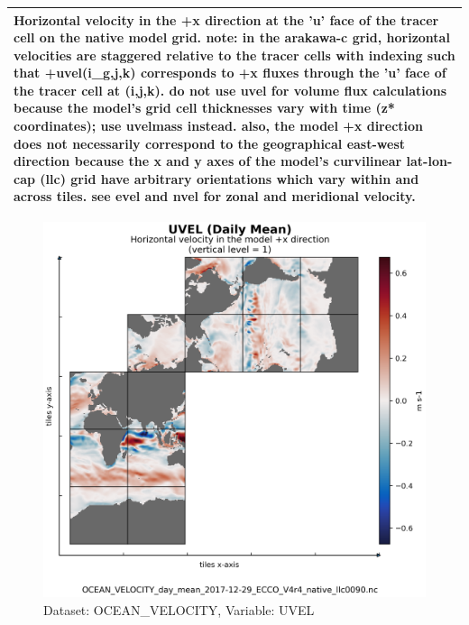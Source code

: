 \begin{longtable}{|m{}|m{}|m{}|m{}|}
\multicolumn{4}{|p{1\textwidth}|}{\footnotesize{{Horizontal velocity in the +x direction at the 'u' face of the tracer cell on the native model grid. note: in the arakawa-c grid, horizontal velocities are staggered relative to the tracer cells with indexing such that +uvel(i\_g,j,k) corresponds to +x fluxes through the 'u' face of the tracer cell at (i,j,k). do not use uvel for volume flux calculations because the model's grid cell thicknesses vary with time (z* coordinates); use uvelmass instead. also, the model +x direction does not necessarily correspond to the geographical east-west direction because the x and y axes of the model's curvilinear lat-lon-cap (llc) grid have arbitrary orientations which vary within and across tiles. see evel and nvel for zonal and meridional velocity.}}} \\ \hline
\end{longtable}

\begin{figure}[H]
\centering
\includegraphics[scale=0.55]{../images/plots/native_plots/Ocean_Velocity/UVEL.png}
\caption{Dataset: OCEAN\_VELOCITY, Variable: UVEL}
\label{tab:table-OCEAN_VELOCITY_UVEL-Plot}
\end{figure}
\newpage
\pagebreak
